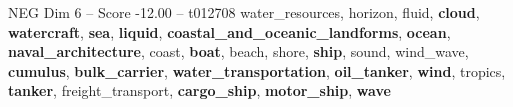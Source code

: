 \begin{textsample}{NEG Dim 6 – Score -12.00 – t012708}  \label{ex:f6_neg_006}
water\_resources, horizon, fluid, \textbf{cloud}, \textbf{watercraft}, \textbf{sea}, \textbf{liquid}, \textbf{coastal\_and\_oceanic\_landforms}, \textbf{ocean}, \textbf{naval\_architecture}, coast, \textbf{boat}, beach, shore, \textbf{ship}, sound, wind\_wave, \textbf{cumulus}, \textbf{bulk\_carrier}, \textbf{water\_transportation}, \textbf{oil\_tanker}, \textbf{wind}, tropics, \textbf{tanker}, freight\_transport, \textbf{cargo\_ship}, \textbf{motor\_ship}, \textbf{wave}

\end{textsample}
